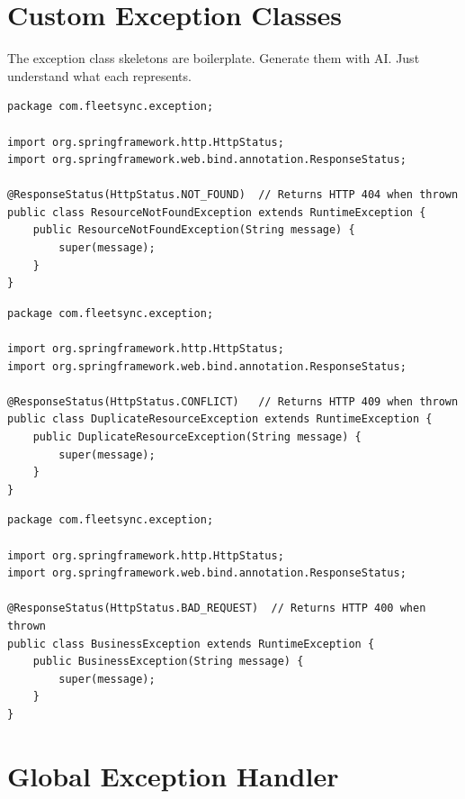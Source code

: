 \documentclass[12pt,a4paper]{report}
\begin{document}
\section{Custom Exception Classes}

\begin{tcolorbox}[aibox]
The exception class skeletons are boilerplate. Generate them with AI. Just understand what each represents.
\end{tcolorbox}

\begin{lstlisting}[caption=ResourceNotFoundException.java]
package com.fleetsync.exception;

import org.springframework.http.HttpStatus;
import org.springframework.web.bind.annotation.ResponseStatus;

@ResponseStatus(HttpStatus.NOT_FOUND)  // Returns HTTP 404 when thrown
public class ResourceNotFoundException extends RuntimeException {
    public ResourceNotFoundException(String message) {
        super(message);
    }
}
\end{lstlisting}

\begin{lstlisting}[caption=DuplicateResourceException.java]
package com.fleetsync.exception;

import org.springframework.http.HttpStatus;
import org.springframework.web.bind.annotation.ResponseStatus;

@ResponseStatus(HttpStatus.CONFLICT)   // Returns HTTP 409 when thrown
public class DuplicateResourceException extends RuntimeException {
    public DuplicateResourceException(String message) {
        super(message);
    }
}
\end{lstlisting}

\begin{lstlisting}[caption=BusinessException.java]
package com.fleetsync.exception;

import org.springframework.http.HttpStatus;
import org.springframework.web.bind.annotation.ResponseStatus;

@ResponseStatus(HttpStatus.BAD_REQUEST)  // Returns HTTP 400 when thrown
public class BusinessException extends RuntimeException {
    public BusinessException(String message) {
        super(message);
    }
}
\end{lstlisting}

\section{Global Exception Handler}
\end{document}
